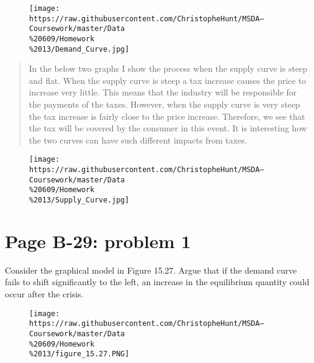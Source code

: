 \documentclass[]{article}
\begin{document}
\begin{figure}[htbp]
\centering
\texttt{[image: https://raw.githubusercontent.com/ChristopheHunt/MSDA---Coursework/master/Data\\\%20609/Homework\\\%2013/Demand\_Curve.jpg]}
\caption{}
\end{figure}

\newpage

\begin{quote}
In the below two graphs I show the process when the supply curve is
steep and flat. When the supply curve is steep a tax increase causes the
price to increase very little. This means that the industry will be
responsible for the payments of the taxes. However, when the supply
curve is very steep the tax increase is fairly close to the price
increase. Therefore, we see that the tax will be covered by the consumer
in this event. It is interesting how the two curves can have such
different impacts from taxes.
\end{quote}

\begin{figure}[htbp]
\centering
\texttt{[image: https://raw.githubusercontent.com/ChristopheHunt/MSDA---Coursework/master/Data\\\%20609/Homework\\\%2013/Supply\_Curve.jpg]}
\caption{}
\end{figure}

\section{Page B-29: problem 1}\label{page-b-29-problem-1}

Consider the graphical model in Figure 15.27. Argue that if the demand
curve fails to shift significantly to the left, an increase in the
equilibrium quantity could occur after the crisis.

\begin{figure}[htbp]
\centering
\texttt{[image: https://raw.githubusercontent.com/ChristopheHunt/MSDA---Coursework/master/Data\\\%20609/Homework\\\%2013/figure\_15.27.PNG]}
\caption{}
\end{figure}

\begin{quote}
\end{quote}
\end{document}
